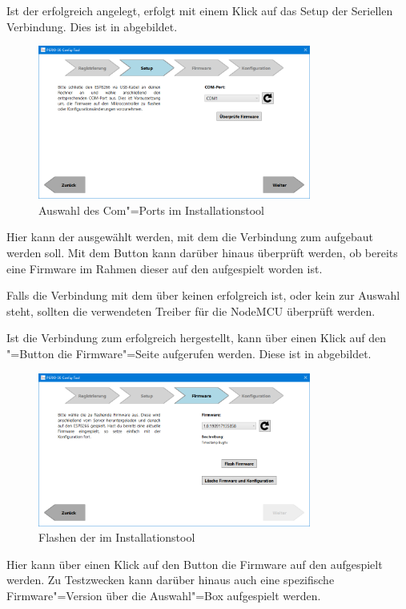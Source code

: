 Ist der \sk erfolgreich angelegt, erfolgt mit einem Klick auf  das Setup der Seriellen Verbindung.
Dies ist in  abgebildet.
\begin{figure}[!htb]
    \centering
    \includegraphics[width=0.8\textwidth]{./ressourcen/i-tool/Setup}
    \caption{Auswahl des Com"=Ports im Installationstool}
    \label{fig:skitool02}
\end{figure}
Hier kann der  ausgewählt werden, mit dem die Verbindung zum \sk aufgebaut werden soll.
Mit dem Button  kann darüber hinaus überprüft werden, ob bereits eine Firmware im Rahmen dieser \pg auf den \sk aufgespielt worden ist.

\begin{mdframed}[frametitle=Hinweis]
	\begin{minipage}{\linewidth}
    	Falls die Verbindung mit dem \sk über keinen  erfolgreich ist, oder kein  zur Auswahl steht, sollten die verwendeten Treiber für die NodeMCU überprüft werden.
	\end{minipage}
\end{mdframed}

Ist die Verbindung zum \sk erfolgreich hergestellt, kann über einen Klick auf den "=Button die Firmware"=Seite aufgerufen werden.
Diese ist in  abgebildet.
\begin{figure}[!htb]
	\centering
	\includegraphics[width=0.8\textwidth]{./ressourcen/i-tool/Firmware}
	\caption{Flashen der \skfw im Installationstool}
	\label{fig:skitool03}
\end{figure}
Hier kann über einen Klick auf den Button  die Firmware auf den \sk aufgespielt werden.
Zu Testzwecken kann darüber hinaus auch eine spezifische Firmware"=Version über die Auswahl"=Box aufgespielt werden.

